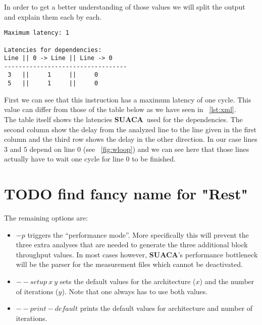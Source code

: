 \documentclass[a4paper,12pt,titlepage, twoside]{report}
\newcommand{\suaca}{\textbf{SUACA}}
\begin{document}
In order to get a better understanding of those values we will split the output and explain them each by each.

\begin{Verbatim}[fontsize=\scriptsize]
Maximum latency: 1

Latencies for dependencies:
Line || 0 -> Line || Line -> 0
----------------------------------
 3   ||     1     ||     0
 5   ||     1     ||     0
\end{Verbatim}
First we can see that this instruction has a maximum latency of one cycle. This value can differ from those of the table below as we have seen in ~\autoref{lst:xml}.\\
The table itself shows the latencies \suaca\ used for the dependencies. The second column show the delay from the analyzed line to the line given in the first column and the third row shows the delay in the other direction. In our case lines $3$ and $5$ depend on line $0$ (see ~\autoref{fig:wloop}) and we can see here that those lines actually have to wait one cycle for line $0$ to be finished.\\

\section{TODO find fancy name for "Rest"}
The remaining options are:

\begin{itemize}
    \item $-p$ triggers the ``performance mode''. More specifically this will prevent the three extra analyses that are needed to generate the three additional block throughput values. In most cases however, \suaca's performance bottleneck will be the parser for the measurement files which cannot be deactivated. 
    \item ${--}setup\ x\ y$ sets the default values for the architecture ($x$) and the number of iterations ($y$). Note that one always has to use both values. 
    \item ${--}print-default$ prints the default values for architecture and number of iterations.
\end{itemize}









\end{document}

